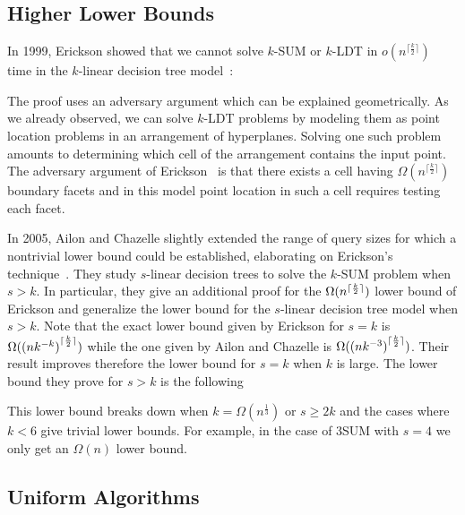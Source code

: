 \subsection{Higher Lower Bounds}

In 1999, Erickson showed that we cannot solve \(k\)-SUM or
\(k\)-LDT in
$o(n^{\lceil\frac{k}{2}\rceil})$
time in the \(k\)-linear decision tree
model~\cite{Er99a}:
%

%
The proof uses an adversary argument which can be explained geometrically. As
we already observed, we can solve \(k\)-LDT problems by modeling them as point
location problems in an arrangement of hyperplanes. Solving one such problem
amounts to determining which cell of the arrangement contains the input point.
The adversary argument of Erickson~\cite{Er99a} is that there exists a cell having
$\Omega(n^{\lceil\frac{k}{2}\rceil})$ boundary facets and in this model point
location in such a cell requires testing each facet.



In 2005, Ailon and Chazelle slightly extended the range of query sizes for
which a nontrivial lower bound could be established, elaborating on Erickson's
technique~\cite{AC05}.
%
They study \(s\)-linear decision trees to solve the \(k\)-SUM problem when
\(s > k\). In particular, they give an additional proof for the
$\Omega(n^{\lceil\frac{k}{2}\rceil})$ lower bound of Erickson and
generalize the lower bound for the \(s\)-linear decision tree model when \(s >
k\). Note that the exact lower bound given by Erickson for \(s = k\) is
$\Omega({(nk^{-k})}^{\lceil\frac{k}{2}\rceil})$ while the one given by
Ailon and Chazelle is $\Omega({(nk^{-3})}^{\lceil\frac{k}{2}\rceil})$. Their result
improves therefore the lower bound for \(s = k\) when \(k\) is large.
The lower bound they prove for \(s > k\) is the following
%

%
This lower bound breaks down when
\(k = \Omega(n^{\frac{1}{3}})\) or \(s \ge 2 k\) and the cases where \(k < 6\)
give trivial lower bounds. For example, in the case
of 3SUM with \(s = 4\) we only get an $\Omega(n)$ lower bound.

\subsection{Uniform Algorithms}%
\label{sec:history:sum:uniform-algorithms}

